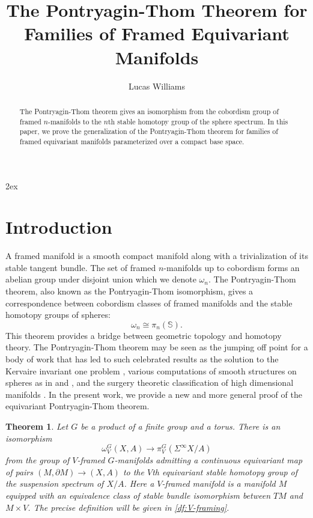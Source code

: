 \documentclass[11pt]{amsart}
\title{The Pontryagin-Thom Theorem for Families of Framed Equivariant Manifolds}
\author{Lucas Williams}
\newcommand{\Sph}{\mathbb{S}}
\theoremstyle{plain}   %
\newtheorem{thm}{Theorem}[section] %
\theoremstyle{definition}
\theoremstyle{remark}
\numberwithin{equation}{section}
\begin{document}
\maketitle

\begin{abstract}
	The Pontryagin-Thom theorem gives an isomorphism from the cobordism group of framed $n$-manifolds to the $n$th stable homotopy group of the sphere spectrum. In this paper, we prove the generalization of the Pontryagin-Thom theorem for families of framed equivariant manifolds parameterized over a compact base space.
\end{abstract}

\setcounter{tocdepth}{2}
\tableofcontents

\parskip 2ex

\section{Introduction}

A framed manifold is a smooth compact manifold along with a trivialization of its stable tangent bundle. The set of framed $n$-manifolds up to cobordism forms an abelian group under disjoint union which we denote $\omega_n$. The Pontryagin-Thom theorem, also known as the Pontryagin-Thom isomorphism, gives a correspondence between cobordism classes of framed manifolds and the stable homotopy groups of spheres:
\[
\omega_n \cong\pi_n(\Sph).
\]
This theorem provides a bridge between geometric topology and homotopy theory. The Pontryagin-Thom theorem may be seen as the jumping off point for a body of work that has led to such celebrated results as the solution to the Kervaire invariant one problem \cite{hhr}, various computations of smooth structures on spheres as in \cite{kervaire-milnor} and \cite{wang_xu_61stem}, and the surgery theoretic classification of high dimensional manifolds \cite{luck_surgery}. In the present work, we provide a new and more general proof of the equivariant Pontryagin-Thom theorem. 

\begin{thm}\label{thm:first main theorem}
Let $G$ be a product of a finite group and a torus. There is an isomorphism 
\[
\omega_V^G(X,A)\to \pi_V^G(\Sigma^\infty X/A)
\]
from the group of $V$-framed $G$-manifolds admitting a continuous equivariant map of pairs $(M,\partial M)\to (X,A)$ to the $V$th equivariant stable homotopy group of the suspension spectrum of $X/A$. Here a $V$-framed manifold is a manifold $M$ equipped with an equivalence class of stable bundle isomorphism between $TM$ and $M\times V$. The precise definition will be given in \cref{df:V-framing}.
\end{thm} 
\end{document}
